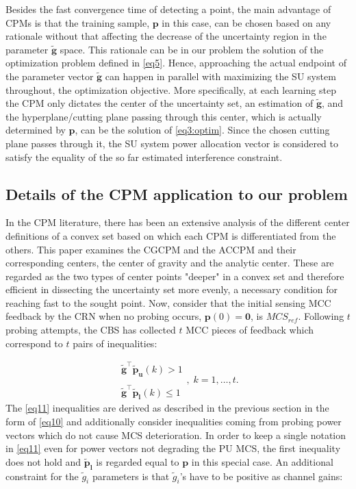 \documentclass[journal]{IEEEtran}
\begin{document}
Besides the fast convergence time of detecting a point, the main advantage of CPMs is that the training sample, $\mathbf{p}$ in this case, can be chosen based on any rationale without that affecting the decrease of the uncertainty region in the parameter $\mathbf{\tilde{g}}$ space. This rationale can be in our problem the solution of the optimization problem defined in \eqref{eq5}. Hence, approaching the actual endpoint of the parameter vector $\mathbf{\tilde{g}}$ can happen in parallel with maximizing the SU system throughout, the optimization objective. More specifically, at each learning step the CPM only dictates the center of the uncertainty set, an estimation of $\mathbf{\tilde{g}}$, and the hyperplane/cutting plane passing through this center, which is actually determined by $\mathbf{p}$, can be the solution of \eqref{eq3:optim}. Since the chosen cutting plane passes through it, the SU system power allocation vector is considered to satisfy the equality of the so far estimated interference constraint.

\subsection{Details of the CPM application to our problem}

In the CPM literature, there has been an extensive analysis of the different center definitions of a convex set based on which each CPM is differentiated from the others. This paper examines the CGCPM and the ACCPM and their corresponding centers, the center of gravity and the analytic center. These are regarded as the two types of center points "deeper" in a convex set and therefore efficient in dissecting the uncertainty set more evenly, a necessary condition for reaching fast to the sought point. Now, consider that the initial sensing MCC feedback by the CRN when no probing occurs, $\mathbf{p}(0)=\mathbf{0}$, is $MCS_{ref}$. Following $t$ probing attempts, the CBS has collected $t$ MCC pieces of feedback which correspond to $t$ pairs of inequalities:

\begin{equation}
  \begin{array}{cc}
   \mathbf{\tilde{g}^\intercal}\mathbf{\tilde{p}_{u}}(k) > 1\\ \\
   \mathbf{\tilde{g}^\intercal}\mathbf{\tilde{p}_{l}}(k) \leq 1
  \end{array}, \; k = 1, \ldots, t
\label{eq11}.
\end{equation}
The \eqref{eq11} inequalities are derived as described in the previous section in the form of \eqref{eq10} and additionally consider inequalities coming from probing power vectors which do not cause MCS deterioration. In order to keep a single notation in \eqref{eq11} even for power vectors not degrading the PU MCS, the first inequality does not hold and $\mathbf{\tilde{p}_{l}}$ is regarded equal to $\mathbf{p}$ in this special case. An additional constraint for the $\tilde{g}_{i}$ parameters is that $\tilde{g}_{i}$'s have to be positive as channel gains:
\end{document}
